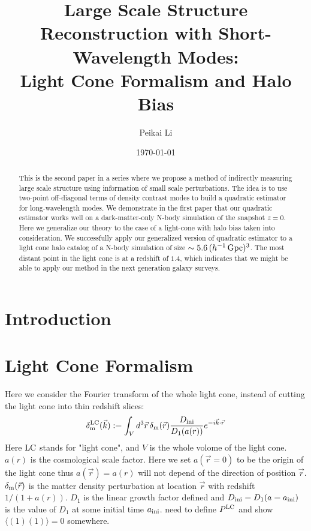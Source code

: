 \documentclass[prd,amsmath,amssymb,floatfix,superscriptaddress,nofootinbib,twocolumn]{revtex4-1}
\def\be{\begin{equation}}
\def\ee{\end{equation}}
\newcommand{\LC}{\rm LC}
\newcommand{\ini}{\rm ini}
\newcommand{\vrr}{\vec{r}}
\newcommand{\vk}{\vec{k}}
\newcommand{\eql}[1]{\label{eq:#1}}
\newcommand{\peikai}[1]{{\color{blue} #1}}
\begin{document}
\title{Large Scale Structure Reconstruction with Short-Wavelength Modes: \\Light Cone Formalism and Halo Bias}
\author{\large Peikai Li}

\date{\today}
\begin{abstract}
\noindent This is the second paper in a series where we propose a method of indirectly measuring large scale structure using information of small scale perturbations. The idea is to use two-point off-diagonal terms of density contrast modes to build a quadratic estimator for long-wavelength modes. We demonstrate in the first paper that our quadratic estimator works well on a dark-matter-only N-body simulation of the snapshot $z=0$. Here we generalize our theory to the case of a light-cone with halo bias taken into consideration. We successfully apply our generalized version of quadratic estimator to a light cone halo catalog of a N-body simulation of size $\sim5.6\,(h^{-1}\,\rm Gpc)^3$. The most distant point in the light cone is at a redshift of $1.4$, which indicates that we might be able to apply our method in the next generation galaxy surveys.
\end{abstract}
\maketitle
\section{Introduction}


\section{Light Cone Formalism}
Here we consider the Fourier transform of the whole light cone, instead of cutting the light cone into thin redshift slices:
\be
\delta^{\LC}_{\rm m}(\vk) :=\int_{V} d^3\vrr  \, \delta_{\rm m}(\vrr) \frac{D_{\ini}}{D_{1}(a(r))}  e^{-i\vk \cdot\vrr} \eql{LC}
\ee
Here $\LC$ stands for "light cone", and $V$ is the whole volome of the light cone. $a(r)$ is the cosmological scale factor. Here we set $a(\vrr=0)$ to be the origin of the light cone thus $a(\vrr)=a(r)$ will not depend of the direction of position $\vrr$. $\delta_{\rm m}(\vrr)$ is the matter density perturbation at location $\vrr$ with redshift $1/(1+a(r))$. $D_1$ is the linear growth factor defined and $D_{\ini} = D_1(a=a_{\ini})$ is the value of $D_1$ at some initial time $a_{\rm ini}$. \peikai{need to define $P^{\rm LC}$ and show $\langle (1)(1) \rangle =0$ somewhere.}
 
\end{document}
